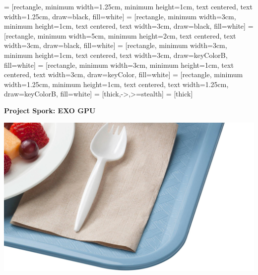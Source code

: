 



 = [rectangle, minimum width=1.25cm, minimum height=1cm, text centered, text width=1.25cm, draw=black, fill=white]
 = [rectangle, minimum width=3cm, minimum height=1cm, text centered, text width=3cm, draw=black, fill=white]
 = [rectangle, minimum width=5cm, minimum height=2cm, text centered, text width=3cm, draw=black, fill=white]
 = [rectangle, minimum width=3cm, minimum height=1cm, text centered, text width=3cm, draw=keyColorB, fill=white]
 = [rectangle, minimum width=3cm, minimum height=1cm, text centered, text width=3cm, draw=keyColor, fill=white]
 = [rectangle, minimum width=1.25cm, minimum height=1cm, text centered, text width=1.25cm, draw=keyColorB, fill=white]
 = [thick,->,>=stealth]
 = [thick]

{\hfill \LARGE \textbf{\textsf{Project Spork: EXO GPU}}}

\includegraphics[width=\linewidth]{usda_spork.jpg}

\newpage


